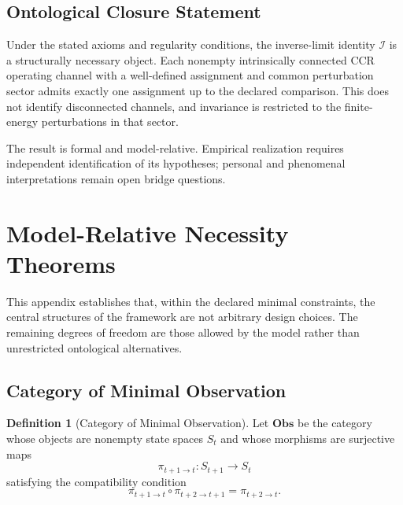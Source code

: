 \documentclass[11pt,a4paper]{article}
\theoremstyle{plain}
\theoremstyle{definition}
\newtheorem{definition}[theorem]{Definition}
\theoremstyle{remark}
\begin{document}
\subsection{Ontological Closure Statement}

Under the stated axioms and regularity conditions, the inverse-limit identity $\mathcal{I}$ is a structurally necessary object. Each nonempty intrinsically connected CCR operating channel with a well-defined assignment and common perturbation sector admits exactly one assignment up to the declared comparison. This does not identify disconnected channels, and invariance is restricted to the finite-energy perturbations in that sector.

The result is formal and model-relative. Empirical realization requires independent identification of its hypotheses; personal and phenomenal interpretations remain open bridge questions.

\appendix
\section{Model-Relative Necessity Theorems}

This appendix establishes that, within the declared minimal constraints, the central structures of the framework are not arbitrary design choices. The remaining degrees of freedom are those allowed by the model rather than unrestricted ontological alternatives.

\subsection{Category of Minimal Observation}

\begin{definition}[Category of Minimal Observation]
Let $\mathbf{Obs}$ be the category whose objects are nonempty state spaces $S_t$ and whose morphisms are surjective maps
\begin{equation}
    \pi_{t+1 \to t}: S_{t+1} \to S_t
\end{equation}
satisfying the compatibility condition
\begin{equation}
    \pi_{t+1 \to t} \circ \pi_{t+2 \to t+1} = \pi_{t+2 \to t}.
\end{equation}
\end{definition}
\end{document}
